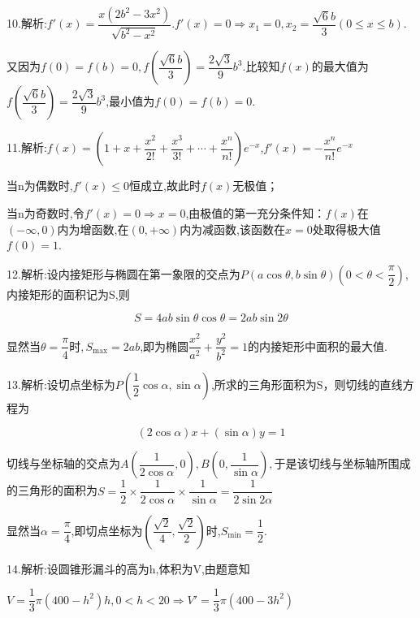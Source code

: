 10.解析:$f'\left( x \right) = \dfrac{{x\left( {2{b^2} - 3{x^2}} \right)}}{{\sqrt {{b^2} - {x^2}} }}.f'\left( x \right) = 0 \Rightarrow {x_1} = 0,{x_2} = \dfrac{{\sqrt 6 b}}{3}\left( {0 \le x \le b} \right)$.

又因为$f\left( 0 \right) = f\left( b \right) = 0,f\left( {\dfrac{{\sqrt 6 b}}{3}} \right) = \dfrac{{2\sqrt 3 }}{9}{b^3}$.比较知$f\left( x \right)$的最大值为$f\left( {\dfrac{{\sqrt 6 b}}{3}} \right) = \dfrac{{2\sqrt 3 }}{9}{b^3}$,最小值为$f\left( 0 \right) = f\left( b \right) = 0$.

11.解析:$f\left( x \right) = \left( {1 + x + \dfrac{{{x^2}}}{{2!}} + \dfrac{{{x^3}}}{{3!}} +  \cdots  + \dfrac{{{x^n}}}{{n!}}} \right){e^{ - x}}$,$f'\left( x \right) =  - \dfrac{{{x^n}}}{{n!}}{e^{ - x}}$

当n为偶数时,$f'\left( x \right) \le 0$恒成立,故此时$f\left( x \right)$无极值；

当n为奇数时,令$f'\left( x \right) = 0 \Rightarrow x = 0$,由极值的第一充分条件知：$f\left( x \right)$在$\left( { - \infty ,0} \right)$内为增函数,在$\left( {0, + \infty } \right)$内为减函数,该函数在$x = 0$处取得极大值$f\left( 0 \right) = 1$.

12.解析:设内接矩形与椭圆在第一象限的交点为$P\left( {a\cos \theta ,b\sin \theta } \right)$$\left( {0 < \theta  < \dfrac{\pi }{2}} \right)$,内接矩形的面积记为S,则

$$S = 4ab\sin \theta \cos \theta  = 2ab\sin 2\theta $$

显然当$\theta  = \dfrac{\pi }{4}$时$,{S_{\max }} = 2ab$,即为椭圆$\dfrac{{{x^2}}}{{{a^2}}} + \dfrac{{{y^2}}}{{{b^2}}} = 1$的内接矩形中面积的最大值.

13.解析:设切点坐标为$P\left( {\dfrac{1}{2}\cos \alpha ,\sin \alpha } \right)$,所求的三角形面积为S，则切线的直线方程为

$$\left( {2\cos \alpha } \right)x + \left( {\sin \alpha } \right)y = 1$$

切线与坐标轴的交点为$A\left( {\dfrac{1}{{2\cos \alpha }},0} \right),B\left( {0,\dfrac{1}{{\sin \alpha }}} \right),$于是该切线与坐标轴所围成的三角形的面积为$S = \dfrac{1}{2} \times \dfrac{1}{{2\cos \alpha }} \times \dfrac{1}{{\sin \alpha }} = \dfrac{1}{{2\sin 2\alpha }}$

显然当$\alpha  = \dfrac{\pi }{4}$,即切点坐标为$\left( {\dfrac{{\sqrt 2 }}{4},\dfrac{{\sqrt 2 }}{2}} \right)$时,${S_{\min }} = \dfrac{1}{2}$.

14.解析:设圆锥形漏斗的高为h,体积为V,由题意知

$V = \dfrac{1}{3}\pi \left( {400 - {h^2}} \right)h,0 < h < 20$$ \Rightarrow V' = \dfrac{1}{3}\pi \left( {400 - 3{h^2}} \right)$

